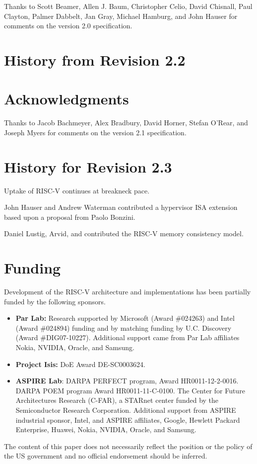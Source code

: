 Thanks to Scott Beamer, Allen J. Baum, Christopher Celio, David Chisnall,
Paul Clayton, Palmer Dabbelt, Jan Gray, Michael Hamburg, and John
Hauser for comments on the version 2.0 specification.

\section{History from Revision 2.2}


\section*{Acknowledgments}

Thanks to Jacob Bachmeyer, Alex Bradbury, David Horner, Stefan O'Rear,
and Joseph Myers for comments on the version 2.1 specification.

\section{History for Revision 2.3}

Uptake of RISC-V continues at breakneck pace.

John Hauser and Andrew Waterman contributed a hypervisor ISA extension
based upon a proposal from Paolo Bonzini.

Daniel Lustig, Arvid, and \fixme{} contributed the RISC-V memory consistency
model.

\section{Funding}

Development of the RISC-V architecture and implementations has been
partially funded by the following sponsors.
\begin{itemize}

\item {\bf Par Lab:} Research supported by Microsoft (Award \#024263) and Intel (Award
    \#024894) funding and by matching funding by U.C. Discovery
    (Award \#DIG07-10227). Additional support came from Par Lab
    affiliates Nokia, NVIDIA, Oracle, and Samsung.

\item {\bf Project Isis:} DoE Award DE-SC0003624.

\item {\bf ASPIRE Lab}: DARPA PERFECT program, Award
    HR0011-12-2-0016.  DARPA POEM program Award HR0011-11-C-0100.  The
    Center for Future Architectures Research (C-FAR), a STARnet center
    funded by the Semiconductor Research Corporation.  Additional
    support from ASPIRE industrial sponsor, Intel, and ASPIRE
    affiliates, Google, Hewlett Packard Enterprise, Huawei, Nokia,
    NVIDIA, Oracle, and Samsung.

\end{itemize}

The content of this paper does not necessarily reflect the position or the
policy of the US government and no official endorsement should be
inferred. 

